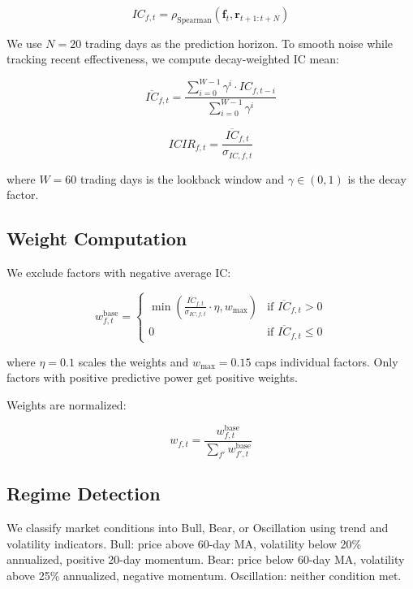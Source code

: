 \begin{equation}
IC_{f,t} = \rho_{\text{Spearman}}(\mathbf{f}_t, \mathbf{r}_{t+1:t+N})
\end{equation}

We use $N=20$ trading days as the prediction horizon. To smooth noise while tracking recent effectiveness, we compute decay-weighted IC mean:

\begin{equation}
\overline{IC}_{f,t} = \frac{\sum_{i=0}^{W-1} \gamma^i \cdot IC_{f,t-i}}{\sum_{i=0}^{W-1} \gamma^i}
\end{equation}

\begin{equation}
ICIR_{f,t} = \frac{\overline{IC}_{f,t}}{\sigma_{IC,f,t}}
\end{equation}

where $W = 60$ trading days is the lookback window and $\gamma \in (0,1)$ is the decay factor.

\subsection{Weight Computation}

We exclude factors with negative average IC:

\begin{equation}
w_{f,t}^{\text{base}} = \begin{cases}
\min\left(\frac{\overline{IC}_{f,t}}{\sigma_{IC,f,t}} \cdot \eta, w_{\text{max}}\right) & \text{if } \overline{IC}_{f,t} > 0 \\
0 & \text{if } \overline{IC}_{f,t} \leq 0
\end{cases}
\end{equation}

where $\eta = 0.1$ scales the weights and $w_{\text{max}} = 0.15$ caps individual factors. Only factors with positive predictive power get positive weights.

Weights are normalized:

\begin{equation}
w_{f,t} = \frac{w_{f,t}^{\text{base}}}{\sum_{f'} w_{f',t}^{\text{base}}}
\end{equation}

\subsection{Regime Detection}

We classify market conditions into Bull, Bear, or Oscillation using trend and volatility indicators. Bull: price above 60-day MA, volatility below 20\% annualized, positive 20-day momentum. Bear: price below 60-day MA, volatility above 25\% annualized, negative momentum. Oscillation: neither condition met.

